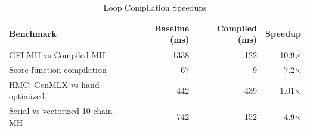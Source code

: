 \begin{table}[t]
\centering
\caption{Loop Compilation Speedups}
\label{tab:compilation}
\small
\begin{tabular}{lrrr}
\toprule
Benchmark & Baseline (ms) & Compiled (ms) & Speedup \\
\midrule
GFI MH vs Compiled MH & 1338 & 122 & 10.9$\times$ \\
Score function compilation & 67 & 9 & 7.2$\times$ \\
HMC: GenMLX vs hand-optimized & 442 & 439 & 1.01$\times$ \\
Serial vs vectorized 10-chain MH & 742 & 152 & 4.9$\times$ \\
\bottomrule
\end{tabular}
\end{table}